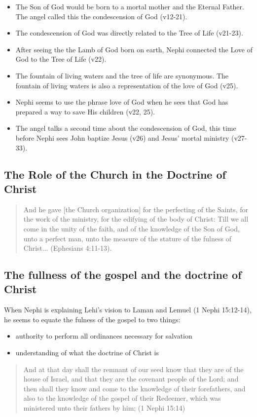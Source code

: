 \begin{itemize}
  \item{The Son of God would be born to a mortal mother and the Eternal Father. The angel called this the condescension of God (v12-21).}
  \item{The condescension of God was directly related to the Tree of Life (v21-23).}
  \item After seeing the the Lamb of God born on earth, Nephi connected the Love of God to the Tree of Life (v22).
  \item The fountain of living waters and the tree of life are synonymous. The fountain of living waters is also a representation of the love of God (v25).
  \item Nephi seems to use the phrase love of God when he sees that God has prepared a way to save His children (v22, 25).
  \item The angel talks a second time about the condescension of God, this time before Nephi sees John baptize Jesus (v26) and Jesus' mortal ministry (v27-33).
\end{itemize}

\subsection{The Role of the Church in the Doctrine of Christ}

\begin{quotation}
And he gave [the Church organization] for the perfecting of the Saints, for the work of the ministry, for the edifying of the body of Christ: Till we all come in the unity of the faith, and of the knowledge of the Son of God, unto a perfect man, unto the measure of the stature of the fulness of Christ... (Ephesians 4:11-13).
\end{quotation}

\subsection{The fullness of the gospel and the doctrine of Christ}
When Nephi is explaining Lehi's vision to Laman and Lemuel (1 Nephi 15:12-14), he seems to equate the fulness of the gospel to two things:
\begin{itemize}
  \item authority to perform all ordinances necessary for salvation
  \item understanding of what the doctrine of Christ is
\end{itemize}

\begin{quotation}
And at that day shall the remnant of our seed know that they are of the house of Israel, and that they are the covenant people of the Lord; and then shall they know and come to the knowledge of their forefathers, and also to the knowledge of the gospel of their Redeemer, which was ministered unto their fathers by him;  (1 Nephi 15:14)
\end{quotation}
